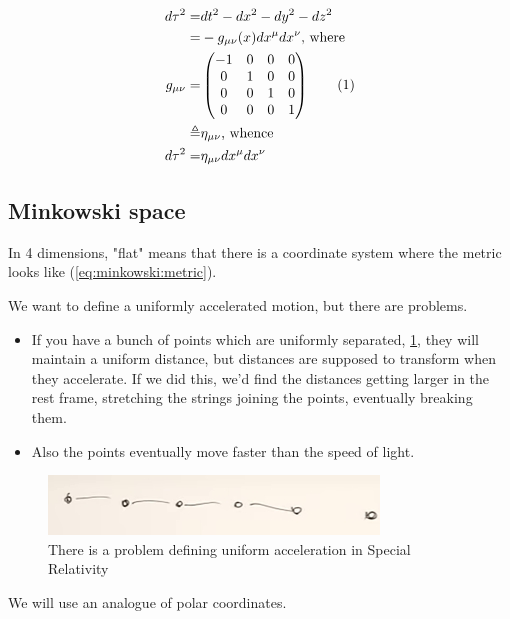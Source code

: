 \documentclass[]{article}
\newcommand\numberthis{\addtocounter{equation}{1}\tag{\theequation}}
\begin{document}
{\begin{align*}
	d \tau^2 =& dt^2 -dx^2 -dy^2 -dz^2\\
	=& - g_{\mu\nu}(x) dx^\mu dx^\nu \text{, where }\\
	g_{\mu\nu} =& \begin{pmatrix}
		-1 &0&0&0\\
		0&1&0&0\\
		0&0&1&0\\
		0&0&0&1
	\end{pmatrix} \numberthis \label{eq:minkowski:metric}\\
	\triangleq& \eta_{\mu\nu} \text{, whence}\\
	d \tau^2=& \eta_{\mu\nu} dx^\mu dx^\nu
\end{align*}

\subsection{Minkowski space}

In 4 dimensions, "flat" means that there is a coordinate system where the metric looks like (\ref{eq:minkowski:metric}).

We want to define a uniformly accelerated motion, but there are problems. \begin{itemize}
	\item If you have a bunch of points which are uniformly separated, \ref{fig:gr-4-uniform-acceleration}, they will maintain a uniform distance, but distances are supposed to transform when they accelerate. If we did this, we'd find the distances getting larger in the rest frame, stretching the strings joining the points, eventually breaking them.
	\item Also the points eventually move faster than the speed of light.
\end{itemize}

\begin{figure}[H]
	\caption[Defining uniform acceleration in Special Relativity]{There is a problem defining uniform acceleration in Special Relativity }\label{fig:gr-4-uniform-acceleration}
	\includegraphics{gr-4-uniform-acceleration}
\end{figure}

We will use an analogue of polar coordinates.

}
\end{document}
